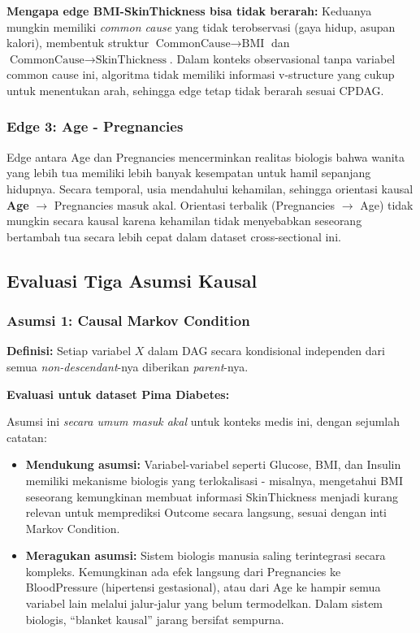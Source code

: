 \documentclass[
  11pt,
]{article}
\providecommand{\tightlist}{%
  \setlength{\itemsep}{0pt}\setlength{\parskip}{0pt}}
\begin{document}
\textbf{Mengapa edge BMI-SkinThickness bisa tidak berarah:} Keduanya
mungkin memiliki \emph{common cause} yang tidak terobservasi (gaya
hidup, asupan kalori), membentuk struktur
\(\text{CommonCause} \to \text{BMI}\) dan
\(\text{CommonCause} \to \text{SkinThickness}\). Dalam konteks
observasional tanpa variabel common cause ini, algoritma tidak memiliki
informasi v-structure yang cukup untuk menentukan arah, sehingga edge
tetap tidak berarah sesuai CPDAG.

\subsubsection{Edge 3: Age -
Pregnancies}\label{edge-3-age---pregnancies}

Edge antara Age dan Pregnancies mencerminkan realitas biologis bahwa
wanita yang lebih tua memiliki lebih banyak kesempatan untuk hamil
sepanjang hidupnya. Secara temporal, usia mendahului kehamilan, sehingga
orientasi kausal \textbf{Age} \(\to\) Pregnancies masuk akal. Orientasi
terbalik (Pregnancies \(\to\) Age) tidak mungkin secara kausal karena
kehamilan tidak menyebabkan seseorang bertambah tua secara lebih cepat
dalam dataset cross-sectional ini.

\subsection{Evaluasi Tiga Asumsi
Kausal}\label{evaluasi-tiga-asumsi-kausal}

\subsubsection{Asumsi 1: Causal Markov
Condition}\label{asumsi-1-causal-markov-condition}

\textbf{Definisi:} Setiap variabel \(X\) dalam DAG secara kondisional
independen dari semua \emph{non-descendant}-nya diberikan
\emph{parent}-nya.

\textbf{Evaluasi untuk dataset Pima Diabetes:}

Asumsi ini \emph{secara umum masuk akal} untuk konteks medis ini, dengan
sejumlah catatan:

\begin{itemize}
\tightlist
\item
  \textbf{Mendukung asumsi:} Variabel-variabel seperti Glucose, BMI, dan
  Insulin memiliki mekanisme biologis yang terlokalisasi - misalnya,
  mengetahui BMI seseorang kemungkinan membuat informasi SkinThickness
  menjadi kurang relevan untuk memprediksi Outcome secara langsung,
  sesuai dengan inti Markov Condition.
\item
  \textbf{Meragukan asumsi:} Sistem biologis manusia saling terintegrasi
  secara kompleks. Kemungkinan ada efek langsung dari Pregnancies ke
  BloodPressure (hipertensi gestasional), atau dari Age ke hampir semua
  variabel lain melalui jalur-jalur yang belum termodelkan. Dalam sistem
  biologis, ``blanket kausal'' jarang bersifat sempurna.
\end{itemize}
\end{document}
